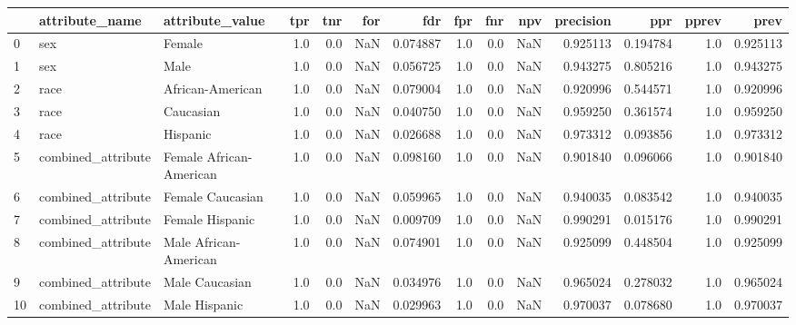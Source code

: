 \begin{tabular}{lllrrrrrrrrrrr}
\toprule
{} &      attribute\_name &          attribute\_value &  tpr &  tnr &  for &       fdr &  fpr &  fnr &  npv &  precision &       ppr &  pprev &      prev \\
\midrule
0  &                 sex &                   Female &  1.0 &  0.0 &  NaN &  0.074887 &  1.0 &  0.0 &  NaN &   0.925113 &  0.194784 &    1.0 &  0.925113 \\
1  &                 sex &                     Male &  1.0 &  0.0 &  NaN &  0.056725 &  1.0 &  0.0 &  NaN &   0.943275 &  0.805216 &    1.0 &  0.943275 \\
2  &                race &         African-American &  1.0 &  0.0 &  NaN &  0.079004 &  1.0 &  0.0 &  NaN &   0.920996 &  0.544571 &    1.0 &  0.920996 \\
3  &                race &                Caucasian &  1.0 &  0.0 &  NaN &  0.040750 &  1.0 &  0.0 &  NaN &   0.959250 &  0.361574 &    1.0 &  0.959250 \\
4  &                race &                 Hispanic &  1.0 &  0.0 &  NaN &  0.026688 &  1.0 &  0.0 &  NaN &   0.973312 &  0.093856 &    1.0 &  0.973312 \\
5  &  combined\_attribute &  Female African-American &  1.0 &  0.0 &  NaN &  0.098160 &  1.0 &  0.0 &  NaN &   0.901840 &  0.096066 &    1.0 &  0.901840 \\
6  &  combined\_attribute &         Female Caucasian &  1.0 &  0.0 &  NaN &  0.059965 &  1.0 &  0.0 &  NaN &   0.940035 &  0.083542 &    1.0 &  0.940035 \\
7  &  combined\_attribute &          Female Hispanic &  1.0 &  0.0 &  NaN &  0.009709 &  1.0 &  0.0 &  NaN &   0.990291 &  0.015176 &    1.0 &  0.990291 \\
8  &  combined\_attribute &    Male African-American &  1.0 &  0.0 &  NaN &  0.074901 &  1.0 &  0.0 &  NaN &   0.925099 &  0.448504 &    1.0 &  0.925099 \\
9  &  combined\_attribute &           Male Caucasian &  1.0 &  0.0 &  NaN &  0.034976 &  1.0 &  0.0 &  NaN &   0.965024 &  0.278032 &    1.0 &  0.965024 \\
10 &  combined\_attribute &            Male Hispanic &  1.0 &  0.0 &  NaN &  0.029963 &  1.0 &  0.0 &  NaN &   0.970037 &  0.078680 &    1.0 &  0.970037 \\
\bottomrule
\end{tabular}
